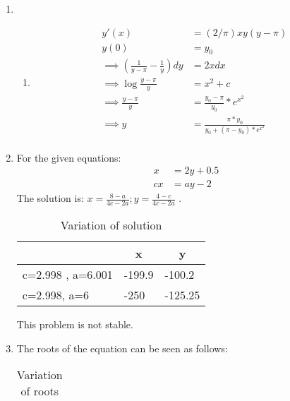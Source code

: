 \documentclass[11pt]{article}
\begin{document}
\begin{enumerate}
\begin{enumerate}
				\item 
					\begin{enumerate}
						\item 
								\begin{align*}
									y'(x) &= (2/\pi)xy(y-\pi) \\
									y(0) &= y_0 \\
									\implies (\frac{1}{y-\pi} -\frac{1}{y})dy &= 2x dx \\
										\implies \log{\frac{y-\pi}{y}} &= x^2 + c \\
								\implies \frac{y-\pi}{y} &= \frac{y_0 - \pi}{y_0} * e^{x^2} \\
									\implies y &= \frac{\pi *y_0}{y_0 + (\pi - y_0)*e^{x^2}} \\
								\end{align*}
					\end{enumerate}
				\item 
						For the given equations: \\
						\begin{align*}
							x &= 2y + 0.5\\
							cx &= ay -2 
						\end{align*}
						The solution is: $x=\frac{8-a}{4c-2a} ; y = \frac{4-c}{4c - 2a}$ .\\
								\begin{table}[!htb]
								\centering
								\caption{Variation of solution}
								\label{my-label}
								\begin{tabular}{|l|l|l|}
								\hline
								\multicolumn{1}{|c|}{\textbf{}} & \multicolumn{1}{c|}{\textbf{x}} & \multicolumn{1}{c|}{\textbf{y}} \\ \hline
								c=2.998 , a=6.001               & -199.9                          & -100.2                          \\ \hline
								c=2.998, a=6                    & -250                            & -125.25                         \\ \hline
								\end{tabular}
								\end{table}
						This problem is not stable.
				\item 
					The roots of the equation can be seen as follows:\\
						\begin{table}[!htb]
						\centering
						\caption{Variation of roots}
						\label{my-label}
						\begin{tabular}{|c|c|c|c|}

\end{tabular}
\end{table}
\end{enumerate}
\end{enumerate}
\end{document}
